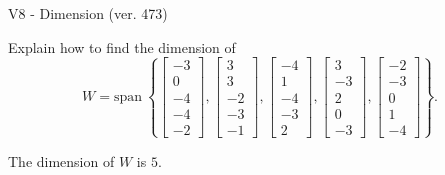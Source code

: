 \begin{exercise}
  \begin{exerciseTitle}V8 - Dimension (ver. 473)\end{exerciseTitle}
  \begin{exerciseStatement}
    Explain how to find the dimension of 
\[W=\mathrm{span}\ \left\{\left[\begin{array}{r}
-3 \\
0 \\
-4 \\
-4 \\
-2
\end{array}\right] , \left[\begin{array}{r}
3 \\
3 \\
-2 \\
-3 \\
-1
\end{array}\right] , \left[\begin{array}{r}
-4 \\
1 \\
-4 \\
-3 \\
2
\end{array}\right] , \left[\begin{array}{r}
3 \\
-3 \\
2 \\
0 \\
-3
\end{array}\right] , \left[\begin{array}{r}
-2 \\
-3 \\
0 \\
1 \\
-4
\end{array}\right]\right\}.\]



  \end{exerciseStatement}
  \begin{exerciseAnswer}
   The dimension of \(W\) is  \(5\).
  


  \end{exerciseAnswer}
\end{exercise}